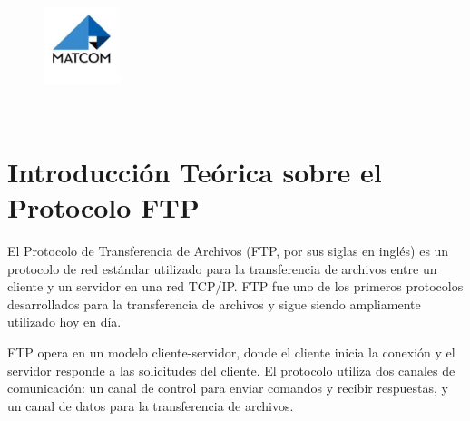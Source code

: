 \documentclass[a4paper, 12pt]{article}
\begin{document}
\graphicspath{{./}}

\begin{center}
\\
\vspace {0.5cm}
\\
\vspace {0.5cm}
\\
\vspace {5cm}
\\
\\
\vspace {1cm}
\vspace {2cm}
\\
\vspace {0.5cm}
\\
\vspace {0.5cm}
\\
\vspace {0.5cm}
\begin{figure}[h]
    \centering
    \includegraphics[width=0.2\textwidth, height=0.2\textheight]{MATCOM.jpg}
\end{figure}
\vspace {0.5cm}
\\


\end{center}

\newpage
\tableofcontents
\newpage

\section{Introducción Teórica sobre el Protocolo FTP}
El Protocolo de Transferencia de Archivos (FTP, por sus siglas en inglés) es un protocolo de red estándar utilizado para la transferencia de archivos entre un cliente y un servidor en una red TCP/IP. FTP fue uno de los primeros protocolos desarrollados para la transferencia de archivos y sigue siendo ampliamente utilizado hoy en día.

FTP opera en un modelo cliente-servidor, donde el cliente inicia la conexión y el servidor responde a las solicitudes del cliente. El protocolo utiliza dos canales de comunicación: un canal de control para enviar comandos y recibir respuestas, y un canal de datos para la transferencia de archivos.
\end{document}
